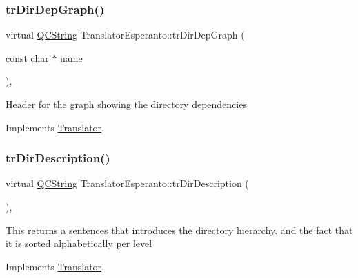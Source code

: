 \mbox{\label{class_translator_esperanto_a139204d170e149504ffa973dfdc3479b}} 
\subsubsection{\texorpdfstring{trDirDepGraph()}{trDirDepGraph()}}
{\footnotesize\ttfamily virtual \mbox{\hyperlink{class_q_c_string}{Q\+C\+String}} Translator\+Esperanto\+::tr\+Dir\+Dep\+Graph (\begin{DoxyParamCaption}\item[{const char $\ast$}]{name }\end{DoxyParamCaption})\hspace{0.3cm}{\ttfamily [inline]}, {\ttfamily [virtual]}}

Header for the graph showing the directory dependencies 

Implements \mbox{\hyperlink{class_translator}{Translator}}.

\mbox{\label{class_translator_esperanto_a90e0bfcd2ba2aecace40fa6e9cba46ba}} 
\subsubsection{\texorpdfstring{trDirDescription()}{trDirDescription()}}
{\footnotesize\ttfamily virtual \mbox{\hyperlink{class_q_c_string}{Q\+C\+String}} Translator\+Esperanto\+::tr\+Dir\+Description (\begin{DoxyParamCaption}{ }\end{DoxyParamCaption})\hspace{0.3cm}{\ttfamily [inline]}, {\ttfamily [virtual]}}

This returns a sentences that introduces the directory hierarchy. and the fact that it is sorted alphabetically per level 

Implements \mbox{\hyperlink{class_translator}{Translator}}.

\mbox{\label{class_translator_esperanto_a914c3a2f269f518a7d893d41a4d35cb0}} 
